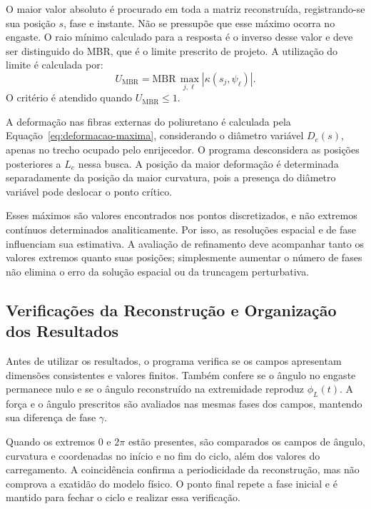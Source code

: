 \documentclass[arial,centeredequations,english,brazilian,oneside,section=TITLE]{ifes8}
\begin{document}
O maior valor absoluto é procurado em toda a matriz reconstruída, registrando-se
sua posição $s$, fase e instante. Não se pressupõe que esse máximo ocorra
no engaste. O raio mínimo calculado para a resposta é o inverso desse
valor e deve ser distinguido do MBR, que é o limite prescrito de projeto.
A utilização do limite é calculada por:
\begin{equation}
  U_{\mathrm{MBR}}=\mathrm{MBR}\,
    \max_{j,\ell}|\kappa(s_j,\psi_\ell)|.
  \label{eq:utilizacao-mbr-reconstrucao}
\end{equation}
O critério é atendido quando $U_{\mathrm{MBR}}\leq1$.

A deformação nas fibras externas do poliuretano é calculada pela
Equação~\eqref{eq:deformacao-maxima}, considerando o diâmetro variável
$D_e(s)$, apenas no trecho ocupado pelo enrijecedor. O programa desconsidera
as posições posteriores a $L_e$ nessa busca. A posição da maior deformação
é determinada separadamente da posição da maior curvatura, pois a presença
do diâmetro variável pode deslocar o ponto crítico.

Esses máximos são valores encontrados nos pontos discretizados, e não extremos
contínuos determinados analiticamente. Por isso, as resoluções espacial e de
fase influenciam sua estimativa. A avaliação de refinamento deve acompanhar
tanto os valores extremos quanto suas posições; simplesmente aumentar o
número de fases não elimina o erro da solução espacial ou da truncagem
perturbativa.

\subsection{Verificações da Reconstrução e Organização dos Resultados}
\label{sec:verificacoes-reconstrucao-linear}

Antes de utilizar os resultados, o programa verifica se os campos apresentam
dimensões consistentes e valores finitos. Também confere se o ângulo no
engaste permanece nulo e se o ângulo reconstruído na extremidade reproduz
$\phi_L(t)$. A força e o ângulo prescritos são avaliados nas mesmas fases
dos campos, mantendo sua diferença de fase $\gamma$.

Quando os extremos 0 e $2\pi$ estão presentes, são comparados os campos de
ângulo, curvatura e coordenadas no início e no fim do ciclo, além dos valores
do carregamento. A coincidência confirma a periodicidade da reconstrução,
mas não comprova a exatidão do modelo físico. O ponto final repete a fase
inicial e é mantido para fechar o ciclo e realizar essa verificação.
\end{document}
